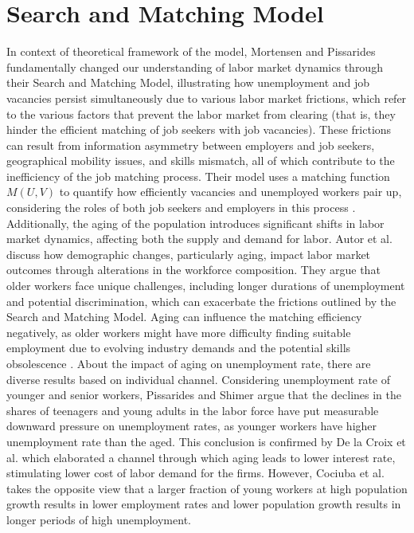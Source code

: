 \documentclass[ %
    final,
    scrbook,
    listoffigures,
    listoftables, 
    glossary]{cu-thesis}
\begin{document}
\section{Search and Matching Model}
In context of theoretical framework of the model, Mortensen and Pissarides \cite{mortensen1994job} fundamentally changed our understanding of labor market dynamics through their Search and Matching Model, illustrating how unemployment and job vacancies persist simultaneously due to various labor market frictions, which refer to the various factors that prevent the labor market from clearing (that is, they hinder the efficient matching of job seekers with job vacancies). These frictions can result from information asymmetry between employers and job seekers, geographical mobility issues, and skills mismatch, all of which contribute to the inefficiency of the job matching process. Their model uses a matching function $M(U, V)$ to quantify how efficiently vacancies and unemployed workers pair up, considering the roles of both job seekers and employers in this process \cite{pissarides2000equilibrium}.
Additionally, the aging of the population introduces significant shifts in labor market dynamics, affecting both the supply and demand for labor. Autor et al. \cite{autor2013growth} discuss how demographic changes, particularly aging, impact labor market outcomes through alterations in the workforce composition. They argue that older workers face unique challenges, including longer durations of unemployment and potential discrimination, which can exacerbate the frictions outlined by the Search and Matching Model. Aging can influence the matching efficiency negatively, as older workers might have more difficulty finding suitable employment due to evolving industry demands and the potential skills obsolescence \cite{bhattacharya2001aging}.
About the impact of aging on unemployment rate, there are diverse results based on individual channel.
Considering unemployment rate of younger and senior workers,  Pissarides \cite{pissarides1989unemployment} and  Shimer \cite{shimer2001impact}
argue that the declines in the shares of teenagers and young adults in the labor force have put measurable downward pressure on unemployment rates, as younger workers have higher unemployment rate than the aged. This conclusion is confirmed by De la Croix et al. \cite{de2013aging} which elaborated a channel through which aging leads to lower interest rate, stimulating lower cost of labor demand for the firms.
However, Cociuba et al. \cite{cociuba2018demographics} takes the opposite view that a larger fraction of young workers at high population growth results in lower employment rates and lower population growth results in longer periods of high unemployment.
\end{document}
